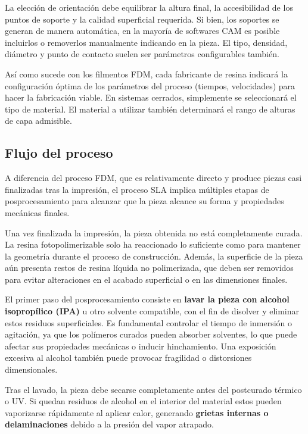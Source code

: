 La elección de orientación debe equilibrar la altura final, la accesibilidad de los puntos de soporte y la calidad superficial requerida. Si bien, los soportes se generan de manera automática, en la mayoría de softwares CAM es posible incluirlos o removerlos manualmente indicando en la pieza. El tipo, densidad, diámetro y punto de contacto suelen ser parámetros configurables también. 

Así como sucede con los filmentos FDM, cada fabricante de resina indicará la configuración óptima de los parámetros del proceso (tiempos, velocidades) para hacer la fabricación viable. En sistemas cerrados, simplemente se seleccionará el tipo de material. El material a utilizar también determinará el rango de alturas de capa admisible.

\subsection{Flujo del proceso}

A diferencia del proceso FDM, que es relativamente directo y produce piezas casi finalizadas tras la impresión, el proceso SLA implica múltiples etapas de posprocesamiento para alcanzar que la pieza alcance su forma y propiedades mecánicas finales.

Una vez finalizada la impresión, la pieza obtenida no está completamente curada. La resina fotopolimerizable solo ha reaccionado lo suficiente como para mantener la geometría durante el proceso de construcción. Además, la superficie de la pieza aún presenta restos de resina líquida no polimerizada, que deben ser removidos para evitar alteraciones en el acabado superficial o en las dimensiones finales.

El primer paso del posprocesamiento consiste en \textbf{lavar la pieza con alcohol isopropílico (IPA)} u otro solvente compatible, con el fin de disolver y eliminar estos residuos superficiales. Es fundamental controlar el tiempo de inmersión o agitación, ya que los polímeros curados pueden absorber solventes, lo que puede afectar sus propiedades mecánicas o inducir hinchamiento. Una exposición excesiva al alcohol también puede provocar fragilidad o distorsiones dimensionales.

Tras el lavado, la pieza debe secarse completamente antes del postcurado térmico o UV. Si quedan residuos de alcohol en el interior del material estos pueden vaporizarse rápidamente al aplicar calor, generando \textbf{grietas internas o delaminaciones} debido a la presión del vapor atrapado.

